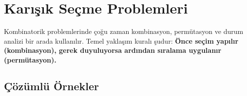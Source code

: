 \section{Karışık Seçme Problemleri}

Kombinatorik problemlerinde çoğu zaman kombinasyon, permütasyon ve durum analizi bir arada kullanılır. Temel yaklaşım kuralı şudur: \textbf{Önce seçim yapılır (kombinasyon), gerek duyuluyorsa ardından sıralama uygulanır (permütasyon).}

\subsection{Çözümlü Örnekler}

